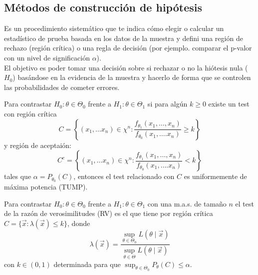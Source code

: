 \subsection{Métodos de construcción de hipótesis}

\begin{definición}
    Es un procedimiento sistemático que te indica cómo elegir o calcular un estadístico de prueba basada en los datos de la muestra y defini una región de rechazo (región crítica) o una regla de decisión (por ejemplo. comparar el p-valor con un nivel de significación $\alpha$). \\
    El objetivo es poder tomar una decisión sobre si rechazar o no la hiótesis nula ($H_0$) basándose en la evidencia de la muestra y hacerlo de forma que se controlen las probabilidades de cometer errores.
\end{definición}

\begin{teorema}
    Para contrastar $H_0: \theta \in \Theta_0$ frente a $H_1: \theta \in \Theta_1$ si para algún $k \geq 0$ existe un test con región crítica
    $$C = \left\{ (x_1, \ldots x_n) \in \chi^n : \frac{f_{\theta_1}(x_1, \ldots, x_n)}{f_{\theta_0}(x_1, \ldots. x_n)} \geq k\right\}$$ y región de aceptaión:
    $$C^c = \left\{ (x_1, \ldots x_n) \in \chi^n : \frac{f_{\theta_1}(x_1, \ldots, x_n)}{f_{\theta_0}(x_1, \ldots. x_n)} < k\right\}$$ 
    tales que $\alpha = P_{\theta_0}(C)$, entonces el test relacionado con $C$ es uniformemente de máxima potencia (TUMP).
\end{teorema}

\ejemplo{

}

\begin{definición}
    Para contrastar $H_0: \theta \in \Theta_0$ frente a $H_1: \theta \in \Theta_1$ con una m.a.s. de tamaño $n$ el test de la razón de verosimilitudes (RV) es el que tiene por región crítica $C = \{\vec{x} : \lambda(\vec{x}) \leq k\}$, donde
    $$\lambda(\vec{x}) = \frac{\sup_{\theta \in \Theta_0} L(\theta \mid \vec{x})}{\sup_{\theta \in \Theta} L(\theta \mid \vec{x})}$$
    con $k \in (0,1)$ determinada para que $\sup_{\theta \in \Theta_0} P_{\theta}(C) \leq \alpha$. 
\end{definición}


